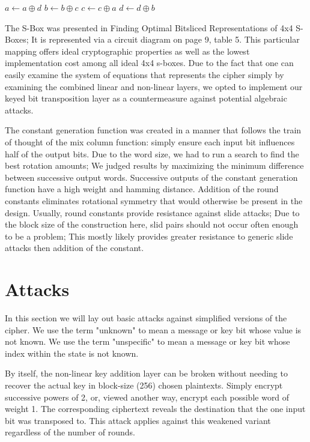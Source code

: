 \documentclass[preprint]{iacrtrans}
\begin{document}
\begin{algorithmic}
	\State $a \gets a \oplus d$ 
	\State $b \gets b \oplus c$ 
	\State $c \gets c \oplus a$ 
	\State $d \gets d \oplus b$ 
\EndFunction
\end{algorithmic}

The S-Box was presented in Finding Optimal Bitsliced Representations of 4x4 S-Boxes; It is represented via a circuit diagram on page 9, table 5. This particular mapping offers ideal cryptographic properties as well as the lowest implementation cost among all ideal 4x4 s-boxes. Due to the fact that one can easily examine the system of equations that represents the cipher simply by examining the combined linear and non-linear layers, we opted to implement our keyed bit transposition layer as a countermeasure against potential algebraic attacks. 

The constant generation function was created in a manner that follows the train of thought of the mix column function: simply ensure each input bit influences half of the output bits. Due to the word size, we had to run a search to find the best rotation amounts; We judged results by maximizing the minimum difference between successive output words. Successive outputs of the constant generation function have a high weight and hamming distance. Addition of the round constants eliminates rotational symmetry that would otherwise be present in the design. Usually, round constants provide resistance against slide attacks; Due to the block size of the construction here, slid pairs should not occur often enough to be a problem; This mostly likely provides greater resistance to generic slide attacks then addition of the constant.

\section{Attacks}
In this section we will lay out basic attacks against simplified versions of the cipher. We use the term "unknown" to mean a message or key bit whose value is not known. We use the term "unspecific" to mean a message or key bit whose index within the state is not known.

By itself, the non-linear key addition layer can be broken without needing to recover the actual key in block-size (256) chosen plaintexts. Simply encrypt successive powers of 2, or, viewed another way, encrypt each possible word of weight 1. The corresponding ciphertext reveals the destination that the one input bit was transposed to. This attack applies against this weakened variant regardless of the number of rounds.
\end{document}
